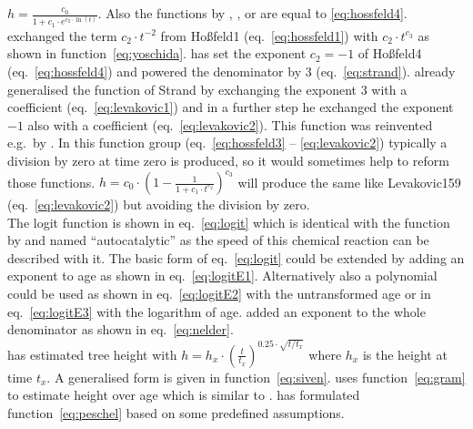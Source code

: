 \documentclass[a4paper,twocolumn]{article}
\begin{document}
$h = \frac{c_0}{1+c_1 \cdot e^{c_2 \cdot \ln(t)}}$. Also the functions
by
\cite{hill1913TheCombinationOfHaemoglobinWithOxygenAndWithCarbonMonoxide}
, \cite{michaelis1913DieKinetikDerInvertinwirkung},
\cite{maynard1973TheStabilityOfPredatorPreySystems} or
\cite{hassell1975DensityDependenceInSingleSpeciesPopulations} are equal
to \ref{eq:hossfeld4}.
\cite{yoshida1928Zuwachskurve} exchanged the term
$c_2 \cdot t^{-2}$ from Ho{\ss}feld1 (eq.~\ref{eq:hossfeld1}) with $c_2
\cdot t^{c_3}$ as shown in function~\ref{eq:yoschida}.
\cite{strand1964SiteIndexCurves} has set the exponent $c_2=-1$ of
Ho{\ss}feld4 (eq.~\ref{eq:hossfeld4}) and powered the
denominator by 3 (eq.~\ref{eq:strand}).
\cite{Levakovic1935Bestandeshoehenkurve} already generalised the
function of Strand by exchanging the exponent $3$ with a coefficient
(eq.~\ref{eq:levakovic1}) and in a further step he exchanged the
exponent $-1$ also with a coefficient (eq.~\ref{eq:levakovic2}). This
function was reinvented e.g.\ by
\cite{gottschalk2005FiveParameterLogistic}.
In this function group (eq.~\ref{eq:hossfeld3} -- \ref{eq:levakovic2})
typically a
division by zero at time zero is produced, so it would sometimes help
to reform those functions.
$h = c_0 \cdot (1 - \frac{1}{1 + c_1\cdot t^{c_2}})^{c_3}$ will
produce the same like Levakovic159 (eq.~\ref{eq:levakovic2}) but
avoiding the division by zero.\\
%
The logit function is shown in eq.~\ref{eq:logit} which is identical
with the function by \cite{robertson1908OnTheNormalRateOfGrowth} and
named ``autocatalytic'' as the speed of this chemical reaction can be
described with it. The basic form of eq.~\ref{eq:logit} could be extended
by adding an exponent to age as shown in
eq.~\ref{eq:logitE1}. Alternatively also a polynomial could be used as shown
in eq.~\ref{eq:logitE2} with the untransformed age or in
eq.~\ref{eq:logitE3} with the logarithm of age. \cite{nelder1962Function}
added an exponent to the whole denominator as shown in
eq.~\ref{eq:nelder}.
\\
\cite{siven1896GrundsaetzeZurBerechnungDesHoehenwachstumsDerNadelhoelzer}
has estimated tree height with
 $h = h_x \cdot (\frac{t}{t_x})^{0.25\cdot \sqrt{t/t_x}}$ 
where $h_x$ is the height at time $t_x$. A generalised form is given
in function~\ref{eq:siven}.
\cite{gram1879KostruktionVonZuwachsuebersichten} uses
function~\ref{eq:gram} to estimate height over
age which is similar to \cite{ricker1954StockAndRecruitment}.
\cite{peschel1938Wachstumsgesetze} has formulated
function~\ref{eq:peschel} based on some predefined assumptions.
\end{document}
